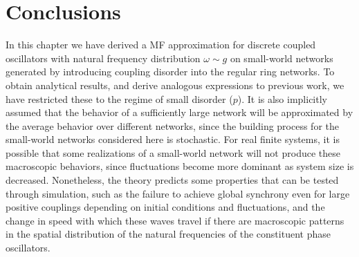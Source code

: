 \section{Conclusions} In this chapter we have derived a MF approximation for discrete coupled oscillators with natural frequency
distribution $\omega\sim g$ on small-world networks generated by introducing coupling disorder into the regular ring networks. To
obtain analytical results, and derive analogous expressions to previous work, we have restricted these to the regime of small disorder
($p$). It is also implicitly assumed that the behavior of a sufficiently large network will be approximated by the average behavior
over different networks, since the building process for the small-world networks considered here is stochastic. For real finite
systems, it is possible that some realizations of a small-world network will not produce these macroscopic behaviors, since
fluctuations become more dominant as system size is decreased. Nonetheless, the theory predicts some properties that can be tested
through simulation, such as the failure to achieve global synchrony even for large positive couplings depending on initial conditions
and fluctuations, and the change in speed with which these waves travel if there are macroscopic patterns in the spatial distribution
of the natural frequencies of the constituent phase oscillators.
